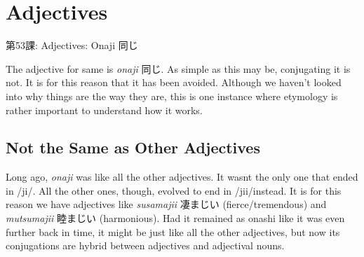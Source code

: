     
\chapter{Adjectives}

\begin{center}
\begin{Large}
第53課: Adjectives: Onaji 同じ 
\end{Large}
\end{center}
 
\par{ The adjective for same is \emph{onaji }同じ. As simple as this may be, conjugating it is not. It is for this reason that it has been avoided. Although we haven't looked into why things are the way they are, this is one instance where etymology is rather important to understand how it works. }
      
\section{Not the Same as Other Adjectives}
 
\par{ Long ago, \emph{onaji }was like all the other adjectives. It wasn\textquotesingle t the only one that ended in \slash ji\slash . All the other ones, though, evolved to end in \slash jii\slash  instead. It is for this reason we have adjectives like \emph{susamajii }凄まじい (fierce\slash tremendous) and \emph{mutsumajii }睦まじい (harmonious). Had it remained as onashi like it was even further back in time, it might be just like all the other adjectives, but now its conjugations are hybrid between adjectives and adjectival nouns. }

